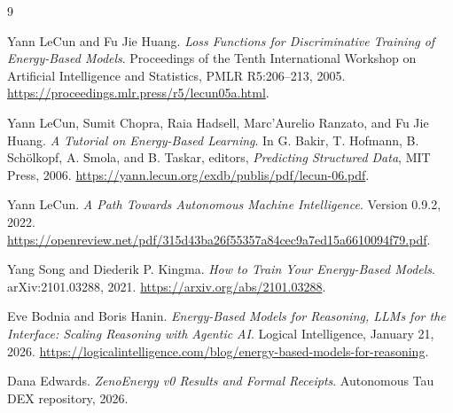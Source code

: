 \documentclass[11pt]{article}
\begin{document}
\begin{thebibliography}{9}

Yann LeCun and Fu Jie Huang.
\newblock \emph{Loss Functions for Discriminative Training of Energy-Based
Models}.
\newblock Proceedings of the Tenth International Workshop on Artificial
Intelligence and Statistics, PMLR R5:206--213, 2005.
\newblock \url{https://proceedings.mlr.press/r5/lecun05a.html}.

Yann LeCun, Sumit Chopra, Raia Hadsell, Marc'Aurelio Ranzato, and Fu Jie
Huang.
\newblock \emph{A Tutorial on Energy-Based Learning}.
\newblock In G. Bakir, T. Hofmann, B. Sch\"olkopf, A. Smola, and B. Taskar,
editors, \emph{Predicting Structured Data}, MIT Press, 2006.
\newblock \url{https://yann.lecun.org/exdb/publis/pdf/lecun-06.pdf}.

Yann LeCun.
\newblock \emph{A Path Towards Autonomous Machine Intelligence}.
\newblock Version 0.9.2, 2022.
\newblock \url{https://openreview.net/pdf/315d43ba26f55357a84cec9a7ed15a6610094f79.pdf}.

Yang Song and Diederik P. Kingma.
\newblock \emph{How to Train Your Energy-Based Models}.
\newblock arXiv:2101.03288, 2021.
\newblock \url{https://arxiv.org/abs/2101.03288}.

Eve Bodnia and Boris Hanin.
\newblock \emph{Energy-Based Models for Reasoning, LLMs for the Interface:
Scaling Reasoning with Agentic AI}.
\newblock Logical Intelligence, January 21, 2026.
\newblock \url{https://logicalintelligence.com/blog/energy-based-models-for-reasoning}.

Dana Edwards.
\newblock \emph{ZenoEnergy v0 Results and Formal Receipts}.
\newblock Autonomous Tau DEX repository, 2026.

\end{thebibliography}
\end{document}
